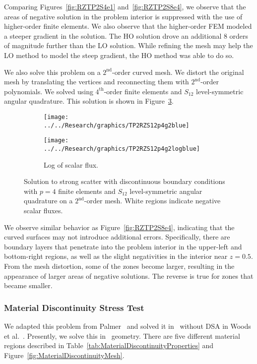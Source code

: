 \documentclass[12pt,letterpaper]{article}
\begin{document}
Comparing Figures~\ref{fig:RZTP2S4e1} and~\ref{fig:RZTP2S8e4}, we observe that the areas of negative solution in the problem interior is suppressed with the use of higher-order finite elements. We also observe that the higher-order FEM modeled a steeper gradient in the solution. The HO solution drove an additional 8 orders of magnitude further than the LO solution. While refining the mesh may help the LO method to model the steep gradient, the HO method was able to do so.

We also solve this problem on a $2^\text{nd}$-order curved mesh. We distort the original mesh by translating the vertices and reconnecting them with $2^\text{nd}$-order polynomials. We solved using $4^\text{th}$-order finite elements and $S_{12}$ level-symmetric angular quadrature. This solution is shown in Figure~\ref{fig:TP2RZS12p4g2}.
%
\begin{figure}[!htb]
\centering
\begin{subfigure}{0.45\textwidth}
\centering
\texttt{[image: ../../Research/graphics/TP2RZS12p4g2blue]}
\label{fig:TP2RZS12p4g2blue}
\end{subfigure}%
\hspace{0.05\textwidth}
\begin{subfigure}{0.45\textwidth}
\centering
\texttt{[image: ../../Research/graphics/TP2RZS12p4g2logblue]}
\caption{Log of scalar flux.}
\label{fig:TP2RZS12p4g2logblue}
\end{subfigure}
\caption{Solution to strong scatter with discontinuous boundary conditions with $p=4$ finite elements and $S_{12}$ level-symmetric angular quadrature on a $2^\text{nd}$-order mesh. White regions indicate negative scalar fluxes.}
\label{fig:TP2RZS12p4g2}
\end{figure}
%
We observe similar behavior as Figure~\ref{fig:RZTP2S8e4}, indicating that the curved surfaces may not introduce additional errors. Specifically, there are boundary layers that penetrate into the problem interior in the upper-left and bottom-right regions, as well as the slight negativities in the interior near $z=0.5$. From the mesh distortion, some of the zones become larger, resulting in the appearance of larger areas of negative solutions. The reverse is true for zones that became smaller.

\FloatBarrier

\subsubsection{Material Discontinuity Stress Test}
\label{sec:RZMaterialDiscontinuity}
We adapted this problem from Palmer~\cite{PalmerDissertation} and solved it in \XY\ without DSA in Woods et al.~\cite{WoodsHoDgfemXyCurved}. Presently, we solve this in \RZ\ geometry. There are five different material regions described in Table~\ref{tab:MaterialDiscontinuityProperties} and Figure~\ref{fig:MaterialDiscontinuityMesh}.
\end{document}
